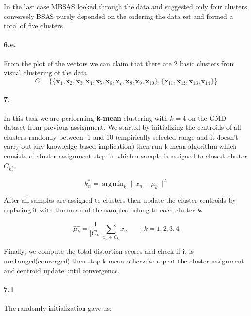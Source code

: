 \documentclass[a4paper]{article}
\DeclareMathOperator*{\argmin}{\arg\!\min}
\begin{document}
	\noindent In the last case MBSAS looked through the data and suggested only four clusters conversely BSAS purely depended on the ordering the data set and formed a total of five clusters. \\
	
\paragraph{6.e.} From the plot of the vectors we can claim that there are 2 basic clusters from visual clustering of the data. \\

	$$ C = \{ \{\mathbf{x}_{1}, \mathbf{x}_{2}, \mathbf{x}_{3}, \mathbf{x}_{4}, \mathbf{x}_{5}, \mathbf{x}_{6}, \mathbf{x}_{7}, \mathbf{x}_{8}, \mathbf{x}_{9}, \mathbf{x}_{10} \}, 
	\{\mathbf{x}_{11}, \mathbf{x}_{12}, \mathbf{x}_{13}, \mathbf{x}_{14}\} \} $$
	
\paragraph{7.} In this task we are performing \textbf{k-mean} clustering with $k = 4$ on the GMD dataset from previous assignment. We started by initializing the centroids of all clusters randomly between -1 and 10 (empirically selected range and it doesn't carry out any knowledge-based implication) then run k-mean algorithm which consists of cluster assignment step in which a sample is assigned to closest cluster $C_{k_n^{\ast}}$.

	\begin{equation}
		k_n^{\ast} = \argmin_k \|x_n - \mu_k\|^2
	\end{equation}
	
	After all samples are assigned to clusters then update the cluster centroids by replacing it with the mean of the samples belong to each cluster $k$.
	
	\begin{equation}
		\hat{\mu_k} = \frac{1}{|C_k|} \sum_{x_n \in C_k} x_n \qquad	; k=1,2,3,4
	\end{equation}
	
	Finally, we compute the total distortion scores and check if it is unchanged(converged) then stop k-mean otherwise repeat the cluster assignment and centroid update until convergence. \\
	
\paragraph{7.1} The randomly initialization gave us: \\
\end{document}
